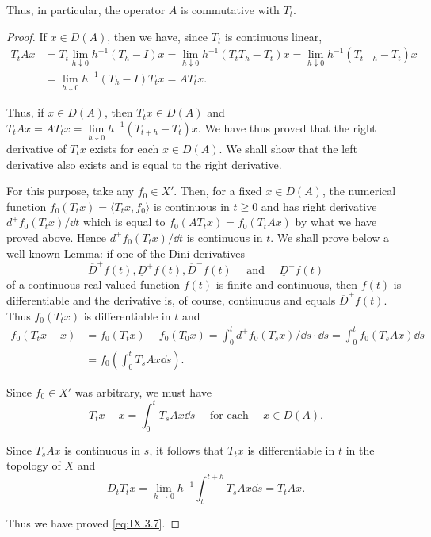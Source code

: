 Thus, in particular, the operator $A$ is commutative with $T_{t}$. 

\begin{proof}
 If $x \in D(A)$, then we have, since $T_{t}$ is continuous linear, 
\[ \begin{aligned} T _{t} A x & = T _{t} \lim\limits _{h \downarrow 0} h ^{-1} (T _{h} - I) x = \lim\limits _{h \downarrow 0} h ^{-1} (T _{t} T _{h} - T _{t}) x = \lim\limits _{h \downarrow 0} h ^{-1} (T _{t+h} - T _{t}) x \\ & = \lim\limits _{h \downarrow 0} h ^{-1} (T _{h} - I) T _{t} x = A T _{t} x. \end{aligned}
\]

Thus, if $x \in D(A)$, then $T_{t}x \in D(A)$ and $T_{t}Ax = AT_{t}x = \lim\limits_{h\downarrow 0} h^{-1}(T_{t+h} - T_{t})x$. We have thus proved that the right derivative of $T_{t}x$ exists for each $x \in D(A)$. We shall show that the left derivative also exists and is equal to the right derivative. 

For this purpose, take any $f_0 \in X'$. Then, for a fixed $x \in D(A)$, the numerical function $f_0(T_t x) = \langle T_t x, f_0 \rangle$ is continuous in $t \geqq 0$ and has right derivative $d^+ f_0(T_t x) / \dd t$ which is equal to $f_0(A T_t x) = f_0(T_t A x)$ by what we have proved above. Hence $d^+ f_0(T_t x) / \dd t$ is continuous in $t$. We shall prove below a well-known Lemma: if one of the Dini derivatives 
\[
\overline {{{D}}} ^{+} f (t), \underline {{{D}}} ^{+} f (t), \overline {{{D}}} ^{-} f (t) \quad \text{ and } \quad \underline {{{D}}} ^{-} f (t)
\]
of a continuous real-valued function $f(t)$ is finite and continuous, then $f(t)$ is differentiable and the derivative is, of course, continuous and equals $\overline{D}^{\pm}f(t)$. Thus $f_0(T_tx)$ is differentiable in $t$ and 
\[
\begin{aligned} f _{0} (T _{t} x - x) & = f _{0} (T _{t} x) - f _{0} (T _{0} x) = \int_{0} ^{t} d ^{+} f _{0} (T _{s} x) / \dd s \cdot \dd s = \int_{0} ^{t} f _{0} (T _{s} A x) \dd s \\ & = f _{0} \left(\int_{0} ^{t} T _{s} A x \dd s\right). \end{aligned}
\]

Since $f_0 \in X'$ was arbitrary, we must have 
\[
T _{t} x - x = \int_{0} ^{t} T _{s} A x \dd s \quad \text{ for each } \quad x \in D (A).
\]

Since $T_{s}Ax$ is continuous in $s$, it follows that $T_{t}x$ is differentiable in $t$ in the topology of $X$ and 
\[
D _{t} T _{t} x = \lim\limits _{h \rightarrow 0} h ^{-1} \int_{t} ^{t+h} T _{s} A x \dd s = T _{t} A x.
\]

Thus we have proved \eqref{eq:IX.3.7}. 
\end{proof}

